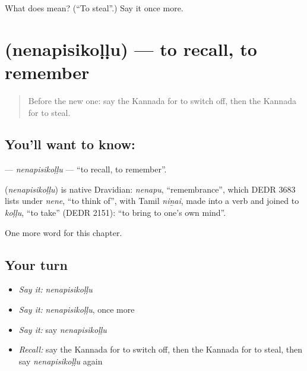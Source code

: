 \begin{tcolorbox}[breakable,colback=teal!4,colframe=teal!35!black,title={Before you move on}]
What does  mean? (\textquotedblleft{}To steal\textquotedblright{}.) Say it once more.
\end{tcolorbox}
\section[\texorpdfstring{\kn{ನೆನಪಿಸಿಕೊಳ್ಳು} (nenapisikoḷḷu)}{ನೆನಪಿಸಿಕೊಳ್ಳು (nenapisikoḷḷu)}]{ (nenapisikoḷḷu) — to recall, to remember}

\label{lesson:KA-C165-nenapisikollu}



\begin{quote}
Before the new one: say the Kannada for to switch off, then the Kannada for to steal.
\end{quote}

\subsection*{You'll want to know: }
\textbf{} — \emph{nenapisikoḷḷu} — \textquotedblleft{}to recall, to remember\textquotedblright{}.

\begin{cousinweb}
\textbf{} (\emph{nenapisikoḷḷu}) is native Dravidian: \emph{nenapu}, \textquotedblleft{}remembrance\textquotedblright{}, which DEDR 3683 lists under \emph{nene}, \textquotedblleft{}to think of\textquotedblright{}, with Tamil \emph{niṉai}, made into a verb and joined to \emph{koḷḷu}, \textquotedblleft{}to take\textquotedblright{} (DEDR 2151): \textquotedblleft{}to bring to one's own mind\textquotedblright{}.
\end{cousinweb}

\begin{grammarlens}[title={What you've built}]
One more word for this chapter.
\end{grammarlens}

\subsection*{Your turn}
\begin{itemize}
\raggedright
  \item \emph{Say it:} \emph{nenapisikoḷḷu}
  \item \emph{Say it:} \emph{nenapisikoḷḷu}, once more
  \item \emph{Say it:} say \emph{nenapisikoḷḷu}
  \item \emph{Recall:} say the Kannada for to switch off, then the Kannada for to steal, then say \emph{nenapisikoḷḷu} again
\end{itemize}

